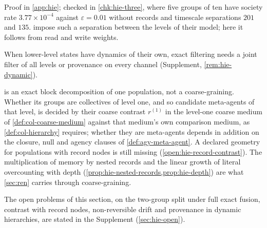 
Proof in \cref{app:hie}; checked in \cref{chk:hie-three}, where five groups of ten have society rate $3.77\times10^{-4}$ against $\varepsilon=0.01$ without records and timescale separations $201$ and $135$.  impose such a separation between the levels of their model; here it follows from read and write weights.

When lower-level states have dynamics of their own, exact filtering needs a joint filter of all levels or provenance on every channel (Supplement, \cref{rem:hie-dynamic}).

 is an exact block decomposition of one population, not a coarse-graining. Whether its groups are collectives of level one, and so candidate meta-agents of that level, is decided by their coarse contrast $r^{(1)}$ in the level-one coarse medium of \cref{def:col-coarse-medium} against that medium's own comparison medium, as \cref{def:col-hierarchy} requires; whether they are meta-agents depends in addition on the closure, null and agency clauses of \cref{def:agy-meta-agent}. A declared geometry for populations with record nodes is still missing (\cref{open:hie-record-contrast}). The multiplication of memory by nested records and the linear growth of literal overcounting with depth (\cref{prop:hie-nested-records,prop:hie-depth}) are what \cref{sec:ren} carries through coarse-graining.

The open problems of this section, on the two-group split under full exact fusion, contrast with record nodes, non-reversible drift and provenance in dynamic hierarchies, are stated in the Supplement (\cref{sec:hie-open}).
